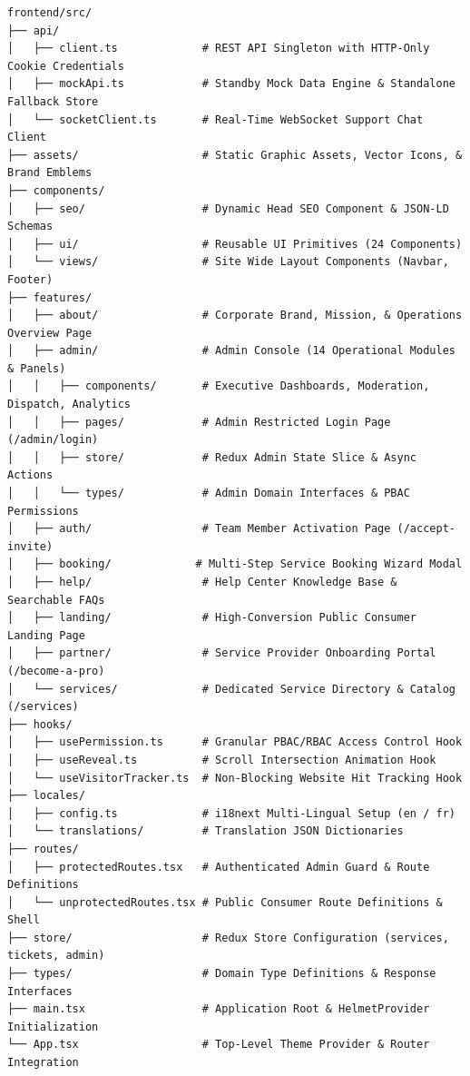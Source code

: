 \documentclass[11pt,a4paper]{article}
\begin{document}
\begin{lstlisting}[caption={Supermarche Comprehensive Frontend Directory Structure}]
frontend/src/
├── api/
│   ├── client.ts             # REST API Singleton with HTTP-Only Cookie Credentials
│   ├── mockApi.ts            # Standby Mock Data Engine & Standalone Fallback Store
│   └── socketClient.ts       # Real-Time WebSocket Support Chat Client
├── assets/                   # Static Graphic Assets, Vector Icons, & Brand Emblems
├── components/
│   ├── seo/                  # Dynamic Head SEO Component & JSON-LD Schemas
│   ├── ui/                   # Reusable UI Primitives (24 Components)
│   └── views/                # Site Wide Layout Components (Navbar, Footer)
├── features/
│   ├── about/                # Corporate Brand, Mission, & Operations Overview Page
│   ├── admin/                # Admin Console (14 Operational Modules & Panels)
│   │   ├── components/       # Executive Dashboards, Moderation, Dispatch, Analytics
│   │   ├── pages/            # Admin Restricted Login Page (/admin/login)
│   │   ├── store/            # Redux Admin State Slice & Async Actions
│   │   └── types/            # Admin Domain Interfaces & PBAC Permissions
│   ├── auth/                 # Team Member Activation Page (/accept-invite)
│   ├── booking/             # Multi-Step Service Booking Wizard Modal
│   ├── help/                 # Help Center Knowledge Base & Searchable FAQs
│   ├── landing/              # High-Conversion Public Consumer Landing Page
│   ├── partner/              # Service Provider Onboarding Portal (/become-a-pro)
│   └── services/             # Dedicated Service Directory & Catalog (/services)
├── hooks/
│   ├── usePermission.ts      # Granular PBAC/RBAC Access Control Hook
│   ├── useReveal.ts          # Scroll Intersection Animation Hook
│   └── useVisitorTracker.ts  # Non-Blocking Website Hit Tracking Hook
├── locales/
│   ├── config.ts             # i18next Multi-Lingual Setup (en / fr)
│   └── translations/         # Translation JSON Dictionaries
├── routes/
│   ├── protectedRoutes.tsx   # Authenticated Admin Guard & Route Definitions
│   └── unprotectedRoutes.tsx # Public Consumer Route Definitions & Shell
├── store/                    # Redux Store Configuration (services, tickets, admin)
├── types/                    # Domain Type Definitions & Response Interfaces
├── main.tsx                  # Application Root & HelmetProvider Initialization
└── App.tsx                   # Top-Level Theme Provider & Router Integration
\end{lstlisting}
\end{document}
